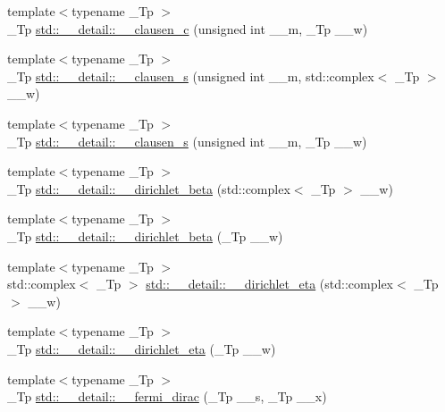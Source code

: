\begin{DoxyCompactItemize}
\item 
{\footnotesize template$<$typename \+\_\+\+Tp $>$ }\\\+\_\+\+Tp \hyperlink{namespacestd_1_1____detail_a44f2a2f49402b847c8408da5b18f8107}{std\+::\+\_\+\+\_\+detail\+::\+\_\+\+\_\+clausen\+\_\+c} (unsigned int \+\_\+\+\_\+m, \+\_\+\+Tp \+\_\+\+\_\+w)
\item 
{\footnotesize template$<$typename \+\_\+\+Tp $>$ }\\\+\_\+\+Tp \hyperlink{namespacestd_1_1____detail_a19bb52bc473e5c3811281acbbdefa869}{std\+::\+\_\+\+\_\+detail\+::\+\_\+\+\_\+clausen\+\_\+s} (unsigned int \+\_\+\+\_\+m, std\+::complex$<$ \+\_\+\+Tp $>$ \+\_\+\+\_\+w)
\item 
{\footnotesize template$<$typename \+\_\+\+Tp $>$ }\\\+\_\+\+Tp \hyperlink{namespacestd_1_1____detail_a1b8a79cb99cbbe5ebbbc16a1dfa7d2c1}{std\+::\+\_\+\+\_\+detail\+::\+\_\+\+\_\+clausen\+\_\+s} (unsigned int \+\_\+\+\_\+m, \+\_\+\+Tp \+\_\+\+\_\+w)
\item 
{\footnotesize template$<$typename \+\_\+\+Tp $>$ }\\\+\_\+\+Tp \hyperlink{namespacestd_1_1____detail_ae2e1407cd73ed7ca37c9085971d64787}{std\+::\+\_\+\+\_\+detail\+::\+\_\+\+\_\+dirichlet\+\_\+beta} (std\+::complex$<$ \+\_\+\+Tp $>$ \+\_\+\+\_\+w)
\item 
{\footnotesize template$<$typename \+\_\+\+Tp $>$ }\\\+\_\+\+Tp \hyperlink{namespacestd_1_1____detail_a6cedea78253fd4d6da481c681a2eed72}{std\+::\+\_\+\+\_\+detail\+::\+\_\+\+\_\+dirichlet\+\_\+beta} (\+\_\+\+Tp \+\_\+\+\_\+w)
\item 
{\footnotesize template$<$typename \+\_\+\+Tp $>$ }\\std\+::complex$<$ \+\_\+\+Tp $>$ \hyperlink{namespacestd_1_1____detail_ac00ca43b3035da757d982b43d2c59bc1}{std\+::\+\_\+\+\_\+detail\+::\+\_\+\+\_\+dirichlet\+\_\+eta} (std\+::complex$<$ \+\_\+\+Tp $>$ \+\_\+\+\_\+w)
\item 
{\footnotesize template$<$typename \+\_\+\+Tp $>$ }\\\+\_\+\+Tp \hyperlink{namespacestd_1_1____detail_acd1e2a576d04658c6332df91cdaacd6e}{std\+::\+\_\+\+\_\+detail\+::\+\_\+\+\_\+dirichlet\+\_\+eta} (\+\_\+\+Tp \+\_\+\+\_\+w)
\item 
{\footnotesize template$<$typename \+\_\+\+Tp $>$ }\\\+\_\+\+Tp \hyperlink{namespacestd_1_1____detail_a6057422cd4e359f44dcdb6cffc26128f}{std\+::\+\_\+\+\_\+detail\+::\+\_\+\+\_\+fermi\+\_\+dirac} (\+\_\+\+Tp \+\_\+\+\_\+s, \+\_\+\+Tp \+\_\+\+\_\+x)

\end{DoxyCompactItemize}
